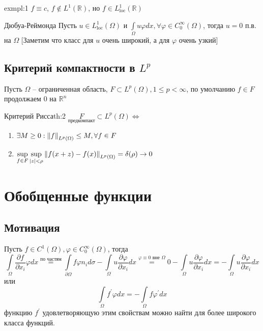 \documentclass[12pt,a4paper]{article}
\newcommand{\intset}[1]{\int\limits_{#1}}
\newcommand{\Real}{\mathbb{R}}
\begin{document}
\begin{example}{}{exmpl:1}
	$f \equiv c$, $f \notin L^1 (\Real)$, но $f \in L^1_{\text{loc}} (\Real)$
\end{example}

\begin{lemma}{Дюбуа-Реймонда}{}
	Пусть $u \in L^1_{\text{loc}} (\Omega)$ и $\intset{\Omega}{u\varphi dx}, \forall \varphi \in C^{\infty}_0 (\Omega)$, тогда $u = 0$ п.в. на $\Omega$ [Заметим что класс для $u$ очень широкий, а для $\varphi$ очень узкий]
\end{lemma}

\subsection{Критерий компактности в $L^p$}

Пусть $\Omega$ -- ограниченная область, $F \subset L^p (\Omega), 1 \leq p < \infty$, по умолчанию $f \in F$ продолжаем 0 на $\Real^n$
\begin{theorem}{Критерий Рисса}{th:2}
	$\underset{\text{предкомпакт}}{F} \subset L^p (\Omega) \Leftrightarrow$
	\begin{enumerate}
		\item $\exists M \geq 0: \norm{f}_{L^p (\Omega)} \leq M, \forall f \in F$
		\item $\sup\limits_{f\in F}{\sup\limits_{|z| < \rho}{\norm{f(x+z) - f(x)}_{L^p (\Omega)}}} = \delta(\rho) \to 0$
	\end{enumerate}
\end{theorem}

\section{Обобщенные функции}

\subsection{Мотивация}

Пусть $f \in C^1 (\Omega), \varphi \in C_0^\infty (\Omega)$, тогда
\begin{equation*}
	\intset{\Omega}{\frac{\partial f}{\partial x_i} \varphi dx} \overset{\text{по частям}}{=} \intset{\partial \Omega}{f \varphi n_i d\sigma} - \intset{\Omega}{u \frac{\partial \varphi}{\partial x_i} dx} \overset{\varphi \equiv 0 \text{ вне } \Omega}{=} 0 - \intset{\Omega}{u \frac{\partial \varphi}{\partial x_i} dx} = -\intset{\Omega}{u \frac{\partial \varphi}{\partial x_i} dx}
\end{equation*}
или
\begin{equation*}
	\intset{\Omega}{f^\prime \varphi dx} = -\intset{\Omega}{f \varphi^\prime dx}
\end{equation*}
функцию $f^\prime$ удовлетворяющую этим свойствам можно найти для более широкого класса функций.
\end{document}

